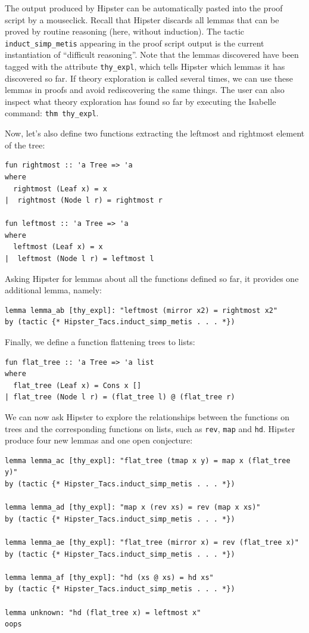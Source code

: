 The output produced by Hipster can be automatically pasted into the proof script by a mouseclick. Recall that Hipster discards all lemmas that can be proved by routine reasoning (here, without induction). The tactic \texttt{induct\_simp\_metis} appearing in the proof script output is the current instantiation of ``difficult reasoning''. Note that the lemmas discovered have been tagged with the attribute \texttt{thy\_expl}, which tells Hipster which lemmas it has discovered so far. If theory exploration is called several times, we can use these lemmas in proofs and avoid rediscovering the same things. The user can also inspect what theory exploration has found so far by executing the Isabelle command: \texttt{thm thy\_expl}.

Now, let's also define two functions extracting the leftmost and rightmost element of the tree:
\begin{small}
\begin{verbatim}
fun rightmost :: 'a Tree => 'a
where 
  rightmost (Leaf x) = x
|  rightmost (Node l r) = rightmost r

fun leftmost :: 'a Tree => 'a
where 
  leftmost (Leaf x) = x
|  leftmost (Node l r) = leftmost l
\end{verbatim}
\end{small}
Asking Hipster for lemmas about all the functions defined so far, it provides one additional lemma, namely:
\begin{small}
\begin{verbatim}
lemma lemma_ab [thy_expl]: "leftmost (mirror x2) = rightmost x2"
by (tactic {* Hipster_Tacs.induct_simp_metis . . . *})
\end{verbatim}
\end{small}
Finally, we define a function flattening trees to lists:
\begin{small}
\begin{verbatim}
fun flat_tree :: 'a Tree => 'a list
where
  flat_tree (Leaf x) = Cons x []
| flat_tree (Node l r) = (flat_tree l) @ (flat_tree r)
\end{verbatim}
\end{small}
We can now ask Hipster to explore the relationships between the functions on trees and the corresponding functions on lists, such as \texttt{rev}, \texttt{map} and \texttt{hd}. Hipster produce four new lemmas and one open conjecture:
\begin{small}
\begin{verbatim}
lemma lemma_ac [thy_expl]: "flat_tree (tmap x y) = map x (flat_tree y)"
by (tactic {* Hipster_Tacs.induct_simp_metis . . . *})

lemma lemma_ad [thy_expl]: "map x (rev xs) = rev (map x xs)"
by (tactic {* Hipster_Tacs.induct_simp_metis . . . *})

lemma lemma_ae [thy_expl]: "flat_tree (mirror x) = rev (flat_tree x)"
by (tactic {* Hipster_Tacs.induct_simp_metis . . . *})

lemma lemma_af [thy_expl]: "hd (xs @ xs) = hd xs"
by (tactic {* Hipster_Tacs.induct_simp_metis . . . *})

lemma unknown: "hd (flat_tree x) = leftmost x"
oops
\end{verbatim}
\end{small}
